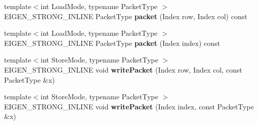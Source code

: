 \begin{DoxyCompactItemize}
\item 
\mbox{\label{struct_eigen_1_1internal_1_1evaluator_3_01_plain_object_base_3_01_derived_01_4_01_4_a6b33a92b0489152b53b04de36e2fb686}} 
{\footnotesize template$<$int Load\+Mode, typename Packet\+Type $>$ }\\E\+I\+G\+E\+N\+\_\+\+S\+T\+R\+O\+N\+G\+\_\+\+I\+N\+L\+I\+NE Packet\+Type {\bfseries packet} (Index row, Index col) const
\item 
\mbox{\label{struct_eigen_1_1internal_1_1evaluator_3_01_plain_object_base_3_01_derived_01_4_01_4_a9dfaff7a6235a590d508d72abf6da9dd}} 
{\footnotesize template$<$int Load\+Mode, typename Packet\+Type $>$ }\\E\+I\+G\+E\+N\+\_\+\+S\+T\+R\+O\+N\+G\+\_\+\+I\+N\+L\+I\+NE Packet\+Type {\bfseries packet} (Index index) const
\item 
\mbox{\label{struct_eigen_1_1internal_1_1evaluator_3_01_plain_object_base_3_01_derived_01_4_01_4_a9e809337fe9d1dd065249d7a0134c5ab}} 
{\footnotesize template$<$int Store\+Mode, typename Packet\+Type $>$ }\\E\+I\+G\+E\+N\+\_\+\+S\+T\+R\+O\+N\+G\+\_\+\+I\+N\+L\+I\+NE void {\bfseries write\+Packet} (Index row, Index col, const Packet\+Type \&x)
\item 
\mbox{\label{struct_eigen_1_1internal_1_1evaluator_3_01_plain_object_base_3_01_derived_01_4_01_4_aac4e36788f0666e4bdd7a348809263d3}} 
{\footnotesize template$<$int Store\+Mode, typename Packet\+Type $>$ }\\E\+I\+G\+E\+N\+\_\+\+S\+T\+R\+O\+N\+G\+\_\+\+I\+N\+L\+I\+NE void {\bfseries write\+Packet} (Index index, const Packet\+Type \&x)
\end{DoxyCompactItemize}
